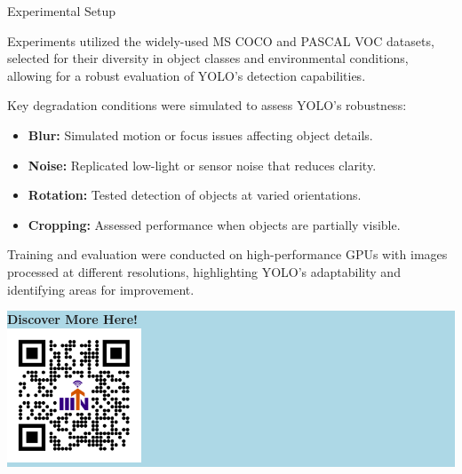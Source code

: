 \documentclass[final]{beamer}
\newlength{\colwidth}
\begin{document}
\begin{frame}[t]
\begin{columns}[t]
\begin{column}{\colwidth}
\begin{block}{Experimental Setup}
    \vspace{0.5cm} %
    
    Experiments utilized the widely-used MS COCO and PASCAL VOC datasets, selected for their diversity in object classes and environmental conditions, allowing for a robust evaluation of YOLO’s detection capabilities.

    Key degradation conditions were simulated to assess YOLO's robustness:

    \begin{itemize}
      \item \textbf{Blur:} Simulated motion or focus issues affecting object details.
      \item \textbf{Noise:} Replicated low-light or sensor noise that reduces clarity.
      \item \textbf{Rotation:} Tested detection of objects at varied orientations.
      \item \textbf{Cropping:} Assessed performance when objects are partially visible.
    \end{itemize}

    Training and evaluation were conducted on high-performance GPUs with images processed at different resolutions, highlighting YOLO’s adaptability and identifying areas for improvement.
\end{block}

\begin{center}
    \colorbox{lightblue}{%
        \begin{minipage}{0.95\textwidth} %
            \vspace{1cm} %
            \centering
            \textbf{Discover More Here!} \\[0.5cm] %
            \vspace{1cm} %
            \includegraphics[width=0.3\textwidth]{logos/VistaQR-website-github_com_rvk7021_DIP-poster-presentation-2.png} %
            \vspace{1cm} %
        \end{minipage}
    }
    \vspace{2cm} %
\end{center}



\end{column}
\end{columns}
\end{frame}
\end{document}
